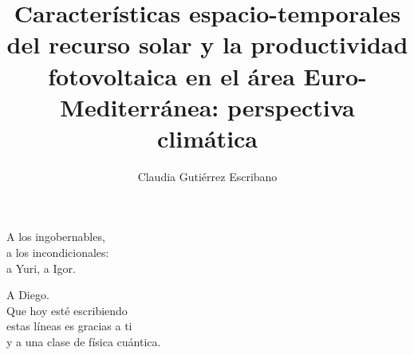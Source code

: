 \documentclass[oldfontcommands, b5paper, 10pt]{memoir}%
\begin{document}

   
\begin{titlingpage}


  
\title{Características espacio-temporales del recurso solar y la productividad fotovoltaica en el área Euro-Mediterránea: perspectiva climática}%

\author{Claudia Gutiérrez Escribano}
\date{}

\titleUL
\newpage
\thispagestyle{empty}
\mbox{}
\maketitle

\end{titlingpage}

\frontmatter

\thispagestyle{empty}
\begin{flushright}
\null{}
A los ingobernables,\\ a los incondicionales:\\ a Yuri, a Igor.
\null
\end{flushright}

\cleardoublepage

\thispagestyle{empty}
\begin{flushright}
\null{}
A Diego.\\ Que hoy esté escribiendo\\ estas líneas es gracias a ti\\ y a una clase de física cuántica.
\null
\end{flushright}


% 




\clearpage



\clearpage

\cleardoublepage

% 
\tableofcontents
 
\printnomenclature


\mainmatter











\appendix

\backmatter

\printbibliography

\clearpage
\listoffigures
\clearpage
\listoftables
\end{document}
